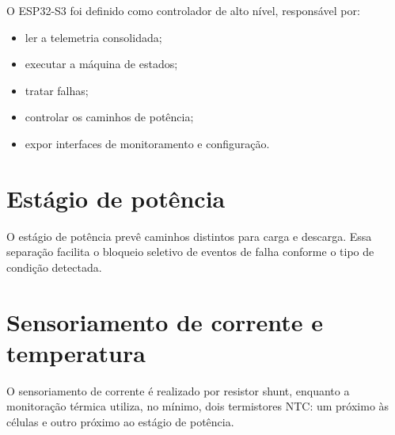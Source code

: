 O ESP32-S3 foi definido como controlador de alto nível, responsável por:

\begin{itemize}
  \item ler a telemetria consolidada;
  \item executar a máquina de estados;
  \item tratar falhas;
  \item controlar os caminhos de potência;
  \item expor interfaces de monitoramento e configuração.
\end{itemize}

\section{Estágio de potência}

O estágio de potência prevê caminhos distintos para carga e descarga. Essa separação facilita
o bloqueio seletivo de eventos de falha conforme o tipo de condição detectada.

\section{Sensoriamento de corrente e temperatura}

O sensoriamento de corrente é realizado por resistor shunt, enquanto a monitoração térmica
utiliza, no mínimo, dois termistores NTC: um próximo às células e outro próximo ao estágio
de potência.
